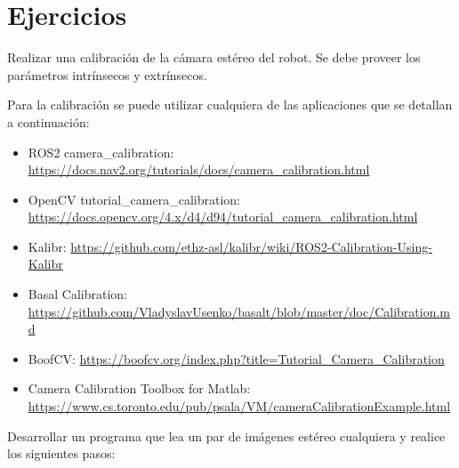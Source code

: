 \documentclass[tp]{lcc}
\begin{document}
\section{Ejercicios}

\ejercicio Realizar una calibración de la cámara estéreo del robot. Se debe proveer los parámetros intrínsecos y extrínsecos.

\begin{nota}
    Para la calibración se puede utilizar cualquiera de las aplicaciones que se detallan a continuación:
    \begin{itemize}
        \item ROS2 camera\_calibration: \url{https://docs.nav2.org/tutorials/docs/camera_calibration.html}
        \item OpenCV tutorial\_camera\_calibration:\\ \url{https://docs.opencv.org/4.x/d4/d94/tutorial_camera_calibration.html}
        \item Kalibr: \url{https://github.com/ethz-asl/kalibr/wiki/ROS2-Calibration-Using-Kalibr}
        \item Basal Calibration: \url{https://github.com/VladyslavUsenko/basalt/blob/master/doc/Calibration.md}
        \item BoofCV: \url{https://boofcv.org/index.php?title=Tutorial_Camera_Calibration}
        \item Camera Calibration Toolbox for Matlab:\\ \url{https://www.cs.toronto.edu/pub/psala/VM/cameraCalibrationExample.html}
    \end{itemize}
\end{nota}

\ejercicio Desarrollar un programa que lea un par de imágenes estéreo cualquiera y realice los siguientes pasos:
\end{document}
